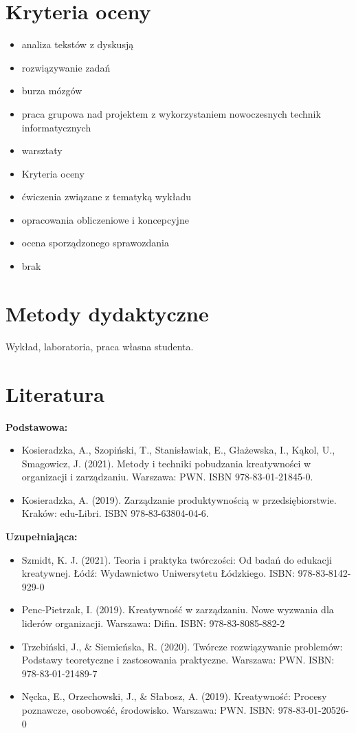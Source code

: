 \documentclass[12pt, a4paper]{article}
\begin{document}
\section{Kryteria oceny}

\begin{itemize}
  \item analiza tekstów z dyskusją
  \item rozwiązywanie zadań
  \item burza mózgów
  \item praca grupowa nad projektem z wykorzystaniem nowoczesnych technik informatycznych
  \item warsztaty
  \item Kryteria oceny
  \item ćwiczenia związane z tematyką wykładu
  \item opracowania obliczeniowe i koncepcyjne
  \item ocena sporządzonego sprawozdania
  \item brak
\end{itemize}

\section{Metody dydaktyczne}

Wykład, laboratoria, praca własna studenta.

\section{Literatura}

\textbf{Podstawowa:}
\begin{itemize}
  \item Kosieradzka, A., Szopiński, T., Stanisławiak, E., Głażewska, I., Kąkol, U., Smagowicz, J. (2021). Metody i techniki pobudzania kreatywności w organizacji i zarządzaniu. Warszawa: PWN. ISBN 978-83-01-21845-0.
  \item Kosieradzka, A. (2019). Zarządzanie produktywnością w przedsiębiorstwie. Kraków: edu-Libri. ISBN 978-83-63804-04-6.
\end{itemize}

\textbf{Uzupełniająca:}
\begin{itemize}
  \item Szmidt, K. J. (2021). Teoria i praktyka twórczości: Od badań do edukacji kreatywnej. Łódź: Wydawnictwo Uniwersytetu Łódzkiego. ISBN: 978-83-8142-929-0
  \item Penc-Pietrzak, I. (2019). Kreatywność w zarządzaniu. Nowe wyzwania dla liderów organizacji. Warszawa: Difin. ISBN: 978-83-8085-882-2
  \item Trzebiński, J., \& Siemieńska, R. (2020). Twórcze rozwiązywanie problemów: Podstawy teoretyczne i zastosowania praktyczne. Warszawa: PWN. ISBN: 978-83-01-21489-7
  \item Nęcka, E., Orzechowski, J., \& Słabosz, A. (2019). Kreatywność: Procesy poznawcze, osobowość, środowisko. Warszawa: PWN. ISBN: 978-83-01-20526-0
\end{itemize}
\end{document}
